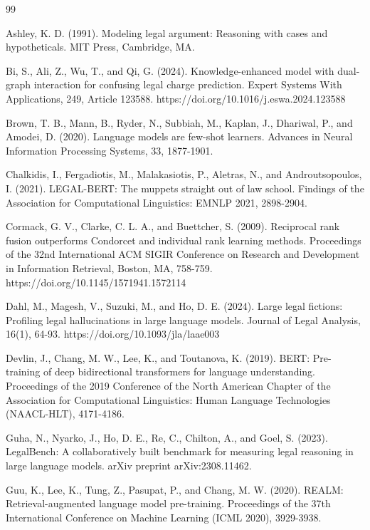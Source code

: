 \documentclass[a4paper,fleqn]{cas-dc}
\begin{document}
\begin{thebibliography}{99}

 Ashley, K. D. (1991). Modeling legal argument: Reasoning with cases and hypotheticals. MIT Press, Cambridge, MA.

 Bi, S., Ali, Z., Wu, T., and Qi, G. (2024). Knowledge-enhanced model with dual-graph interaction for confusing legal charge prediction. Expert Systems With Applications, 249, Article 123588. https://doi.org/10.1016/j.eswa.2024.123588

 Brown, T. B., Mann, B., Ryder, N., Subbiah, M., Kaplan, J., Dhariwal, P., and Amodei, D. (2020). Language models are few-shot learners. Advances in Neural Information Processing Systems, 33, 1877-1901.

 Chalkidis, I., Fergadiotis, M., Malakasiotis, P., Aletras, N., and Androutsopoulos, I. (2021). LEGAL-BERT: The muppets straight out of law school. Findings of the Association for Computational Linguistics: EMNLP 2021, 2898-2904.

 Cormack, G. V., Clarke, C. L. A., and Buettcher, S. (2009). Reciprocal rank fusion outperforms Condorcet and individual rank learning methods. Proceedings of the 32nd International ACM SIGIR Conference on Research and Development in Information Retrieval, Boston, MA, 758-759. https://doi.org/10.1145/1571941.1572114

 Dahl, M., Magesh, V., Suzuki, M., and Ho, D. E. (2024). Large legal fictions: Profiling legal hallucinations in large language models. Journal of Legal Analysis, 16(1), 64-93. https://doi.org/10.1093/jla/laae003

 Devlin, J., Chang, M. W., Lee, K., and Toutanova, K. (2019). BERT: Pre-training of deep bidirectional transformers for language understanding. Proceedings of the 2019 Conference of the North American Chapter of the Association for Computational Linguistics: Human Language Technologies (NAACL-HLT), 4171-4186.

 Guha, N., Nyarko, J., Ho, D. E., Re, C., Chilton, A., and Goel, S. (2023). LegalBench: A collaboratively built benchmark for measuring legal reasoning in large language models. arXiv preprint arXiv:2308.11462.

 Guu, K., Lee, K., Tung, Z., Pasupat, P., and Chang, M. W. (2020). REALM: Retrieval-augmented language model pre-training. Proceedings of the 37th International Conference on Machine Learning (ICML 2020), 3929-3938.


\end{thebibliography}
\end{document}

